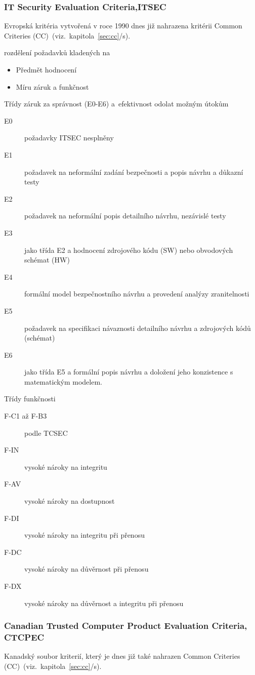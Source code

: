 \documentclass[a4paper,12pt]{article}
\newcommand{\odkazNaKapitolu}[1]{(viz.~kapitola~\ref{#1}/s\pageref{#1})}
\begin{document}
\subsubsection{IT Security Evaluation Criteria,ITSEC}\label{sec:ITSEC}
Evropská kritéria vytvořená v roce 1990 dnes již nahrazena kritérii Common Criteries (CC)~\odkazNaKapitolu{sec:cc}.

rozdělení požadavků kladených na
\begin{itemize}
 \item Předmět hodnocení
 \item Míru záruk a funkčnost
\end{itemize}
Třídy záruk za správnost (E0-E6) a~efektivnost odolat možným útokům~\cite{PrezentaceBIS}
\begin{description}
 \item[E0] požadavky ITSEC nesplněny
 \item[E1] požadavek na neformální zadání bezpečnosti a popis návrhu a důkazní testy
 \item[E2] požadavek na neformální popis detailního návrhu, nezávislé testy
 \item[E3] jako třída E2 a hodnocení zdrojového kódu (SW) nebo obvodových schémat (HW)
 \item[E4] formální model bezpečnostního návrhu a provedení analýzy zranitelnosti
 \item[E5] požadavek na specifikaci návaznosti detailního návrhu a zdrojových kódů (schémat)
 \item[E6] jako třída E5 a formální popis návrhu a doložení jeho konzistence s matematickým modelem. 
\end{description}

Třídy funkčnosti~\cite{PrezentaceBIS}
\begin{description}
\item[F-C1 až F-B3] podle TCSEC 
\item[F-IN] vysoké nároky na integritu
\item[F-AV] vysoké nároky na dostupnost
\item[F-DI] vysoké nároky na integritu při přenosu
\item[F-DC] vysoké nároky na důvěrnost při přenosu
\item[F-DX] vysoké nároky na důvěrnost a integritu při přenosu
\end{description}

\subsubsection{Canadian Trusted Computer Product Evaluation Criteria, CTCPEC}\label{sec:CTCPEC}
Kanadský soubor kriterií, který je dnes již také nahrazen Common Criteries (CC)~\odkazNaKapitolu{sec:cc}.\\
\end{document}

